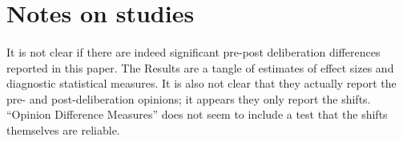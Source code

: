 \documentclass[letterpaper,man,natbib]{apa6}
\begin{document}


\setlength{\bibleftmargin}{.125in}
\setlength{\bibindent}{-\bibleftmargin}



\appendix

\section{Notes on studies}

\paragraph{\citet{Abrams1990}} 

\paragraph{\citet{Burnstein1973}}

\paragraph{\citet{Hogg1990}} It is not clear if there are indeed significant pre-post
deliberation differences reported in this paper. The Results are a tangle of
estimates of effect sizes and diagnostic statistical measures. It is also
not clear that they actually report the pre- and post-deliberation opinions;
it appears they only report the shifts. ``Opinion Difference Measures'' 
does not seem to include a test that the shifts themselves are reliable.
\end{document}
